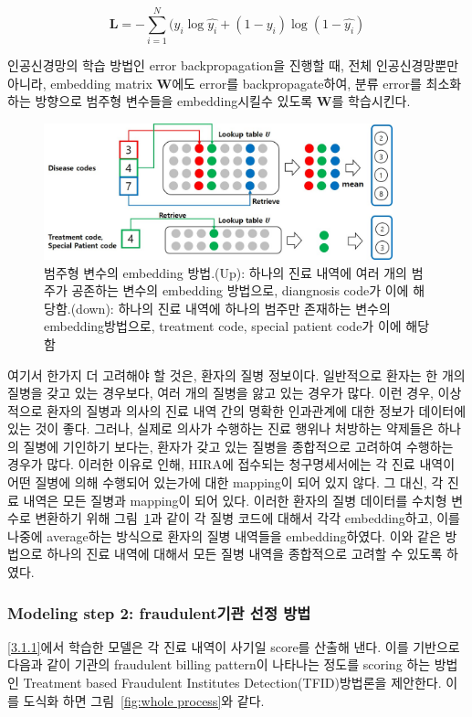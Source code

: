 \documentclass[11pt]{article}           %
\begin{document}
$$\mathbf{L} = -\sum_{i=1}^N(y_i\log\hat{y_i} + (1-y_i)\log(1-\hat{y_i})$$

인공신경망의 학습 방법인 error backpropagation을 진행할 때, 전체 인공신경망뿐만 아니라, embedding matrix $\mathbf{W}$에도 error를 backpropagate하여, 분류 error를 최소화 하는 방향으로 범주형 변수들을 embedding시킬수 있도록 $\mathbf{W}$를 학습시킨다.

\begin{figure}[h]
   \centering
   \vspace{0.5cm}
   \includegraphics[width=0.9\textwidth]{[figure3]embedding_method.jpg}
   \vspace{-0.5cm}
   \caption{범주형 변수의 embedding 방법.(Up): 하나의 진료 내역에 여러 개의 범주가 공존하는 변수의 embedding 방법으로, diangnosis code가 이에 해당함.(down): 하나의 진료 내역에 하나의 범주만 존재하는 변수의 embedding방법으로, treatment code, special patient code가 이에 해당함}
   \vspace{0.5cm}
   \label{fig:category embedding method}
\end{figure}


여기서 한가지 더 고려해야 할 것은, 환자의 질병 정보이다.
일반적으로 환자는 한 개의 질병을 갖고 있는 경우보다, 여러 개의 질병을 앓고 있는 경우가 많다.
이런 경우, 이상적으로 환자의 질병과 의사의 진료 내역 간의 명확한 인과관계에 대한 정보가 데이터에 있는 것이 좋다.
그러나, 실제로 의사가 수행하는 진료 행위나 처방하는 약제들은 하나의 질병에 기인하기 보다는, 환자가 갖고 있는 질병을 종합적으로 고려하여 수행하는 경우가 많다.
이러한 이유로 인해, HIRA에 접수되는 청구명세서에는 각 진료 내역이 어떤 질병에 의해 수행되어 있는가에 대한 mapping이 되어 있지 않다.
그 대신, 각 진료 내역은 모든 질병과 mapping이 되어 있다.
이러한 환자의 질병 데이터를 수치형 변수로 변환하기 위해 그림~\ref{fig:category embedding method}과 같이 각 질병 코드에 대해서 각각 embedding하고, 이를 나중에 average하는 방식으로 환자의 질병 내역들을 embedding하였다.
이와 같은 방법으로 하나의 진료 내역에 대해서 모든 질병 내역을 종합적으로 고려할 수 있도록 하였다.

\subsubsection{Modeling step 2: fraudulent기관 선정 방법}
\ref{3.1.1}에서 학습한 모델은 각 진료 내역이 사기일 score를 산출해 낸다.
이를 기반으로 다음과 같이 기관의 fraudulent billing pattern이 나타나는 정도를 scoring 하는 방법인 Treatment based Fraudulent Institutes Detection(TFID)방법론을 제안한다. 
이를 도식화 하면 그림~\ref{fig:whole process}와 같다.
\end{document}
